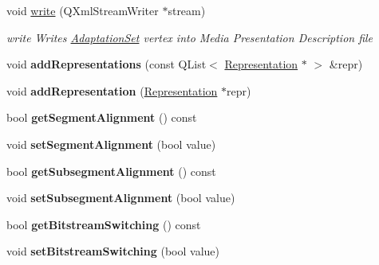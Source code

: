 \begin{DoxyCompactItemize}
\item 
void \hyperlink{class_adaptation_set_a0b84ce665a576038c44a4094a0e6a8f6}{write} (Q\-Xml\-Stream\-Writer $\ast$stream)
\begin{DoxyCompactList}\small\item\em write Writes \hyperlink{class_adaptation_set}{Adaptation\-Set} vertex into Media Presentation Description file \end{DoxyCompactList}\item 
\hypertarget{class_adaptation_set_a73144f3a3eb7f75c34fa130af84ee642}{void {\bfseries add\-Representations} (const Q\-List$<$ \hyperlink{class_representation}{Representation} $\ast$ $>$ \&repr)}\label{class_adaptation_set_a73144f3a3eb7f75c34fa130af84ee642}

\item 
\hypertarget{class_adaptation_set_ab7cd1bdcc0574f6807370f5e335338ea}{void {\bfseries add\-Representation} (\hyperlink{class_representation}{Representation} $\ast$repr)}\label{class_adaptation_set_ab7cd1bdcc0574f6807370f5e335338ea}

\item 
\hypertarget{class_adaptation_set_a415baf1e615a0484291cee992e140016}{bool {\bfseries get\-Segment\-Alignment} () const }\label{class_adaptation_set_a415baf1e615a0484291cee992e140016}

\item 
\hypertarget{class_adaptation_set_a2de7dde364556d07cef9f93877cb7f45}{void {\bfseries set\-Segment\-Alignment} (bool value)}\label{class_adaptation_set_a2de7dde364556d07cef9f93877cb7f45}

\item 
\hypertarget{class_adaptation_set_a56be7033dc336bf4148b867604e87431}{bool {\bfseries get\-Subsegment\-Alignment} () const }\label{class_adaptation_set_a56be7033dc336bf4148b867604e87431}

\item 
\hypertarget{class_adaptation_set_ab99f2cdd9c6f82900b4318f0ce65144e}{void {\bfseries set\-Subsegment\-Alignment} (bool value)}\label{class_adaptation_set_ab99f2cdd9c6f82900b4318f0ce65144e}

\item 
\hypertarget{class_adaptation_set_ae695437f13f904cba226724b7d0f8ff3}{bool {\bfseries get\-Bitstream\-Switching} () const }\label{class_adaptation_set_ae695437f13f904cba226724b7d0f8ff3}

\item 
\hypertarget{class_adaptation_set_a05e19e5c5d6bd9538d037e7b05dd7c2c}{void {\bfseries set\-Bitstream\-Switching} (bool value)}\label{class_adaptation_set_a05e19e5c5d6bd9538d037e7b05dd7c2c}


\end{DoxyCompactItemize}
